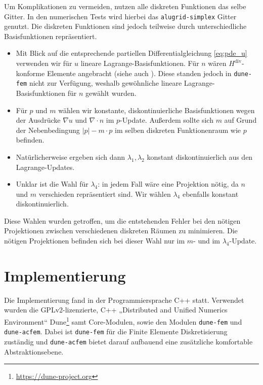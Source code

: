 \documentclass{mythesis}
\begin{document}
Um Komplikationen zu vermeiden, nutzen alle diskreten Funktionen das selbe Gitter.
In den numerischen Tests wird hierbei das \texttt{alugrid-simplex} Gitter \cite{??} genutzt.
Die diskreten Funktionen sind jedoch teilweise durch unterschiedliche Basisfunktionen repräsentiert.
\begin{itemize}
    \item
	Mit Blick auf die entsprechende partiellen Differentialgleichung \eqref{eq:pde_u} verwenden wir für $u$ lineare Lagrange-Basisfunktionen.
	Für $n$ wären $H^{\mathrm{div}}$-konforme Elemente angebracht (siehe auch \cite{??}).
        Diese standen jedoch in \texttt{dune-fem} nicht zur Verfügung, weshalb gewöhnliche lineare Lagrange-Basisfunktionen für $n$ gewählt wurden.
    \item
	Für $p$ und $m$ wählen wir konstante, diskontinuierliche Basisfunktionen wegen der Ausdrücke $\nabla u$ und $\nabla \cdot n$ im $p$-Update.
	Außerdem sollte sich $m$ auf Grund der Nebenbedingung $|p| - m\cdot p$ im selben diskreten Funktionenraum wie $p$ befinden.
    \item
	Natürlicherweise ergeben sich dann $\lambda_1, \lambda_2$ konstant diskontinuierlich aus den Lagrange-Updates.
    \item
	Unklar ist die Wahl für $\lambda_4$: in jedem Fall wäre eine Projektion nötig, da $n$ und $m$ verschieden repräsentiert sind.
	Wir wählen $\lambda_4$ ebenfalls konstant diskontinuierlich.
\end{itemize}
Diese Wahlen wurden getroffen, um die entstehenden Fehler bei den nötigen Projektionen zwischen verschiedenen diskreten Räumen zu minimieren.
Die nötigen Projektionen befinden sich bei dieser Wahl nur im $m$- und im $\lambda_4$-Update.








\section{Implementierung}


Die Implementierung fand in der Programmiersprache C++ statt.
Verwendet wurden die GPLv2-lizenzierte, C++ „Distributed and Unified Numerics Environment“ Dune\footnote{\url{https://dune-project.org}} samt Core-Modulen, sowie den Modulen \texttt{dune-fem} und \texttt{dune-acfem}.
Dabei ist \texttt{dune-fem} für die Finite Elemente Diskretisierung zuständig und \texttt{dune-acfem} bietet darauf aufbauend eine zusätzliche komfortable Abstraktionsebene.
\end{document}
